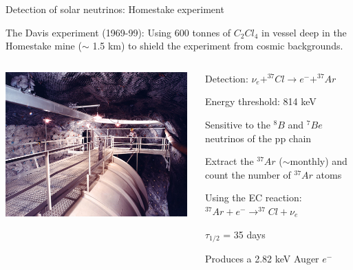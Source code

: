 \begin{frame}[t]{Detection of solar neutrinos: Homestake experiment}

The Davis experiment (1969-99): Using 600 tonnes of $C_{2}Cl_{4}$ in vessel deep in the Homestake mine
($\sim$ 1.5 km) to shield the experiment from cosmic backgrounds.\\
\vspace{0.3cm}
\begin{columns}
  \begin{column}{0.45\textwidth}
    \includegraphics[width=0.98\textwidth]{./images/3nu/solar/davis_experiment_photo.png}\\
  \end{column}
  \begin{column}{0.55\textwidth}
    \begin{itemize}
    {\small
     \item Detection: {\color{red}$\nu_{e} + ^{37}Cl \rightarrow e^{-}
         + ^{37}Ar$}\\
     \item Energy threshold: 814 keV
    \begin{itemize}
     {\small
        \item Sensitive to the $^{8}B$
          and $^{7}Be$ neutrinos of the pp chain
    }
    \end{itemize}
     \item Extract the $^{37}Ar$ ($\sim$monthly) and
       count the number of $^{37}Ar$ atoms
      \begin{itemize}
       {\small
         \item Using the EC reaction: {\color{red}$^{37}Ar +
           e^{-} \rightarrow ^{37}Cl + \nu_{e}$}
         \item $\tau_{1/2}$ = 35 days
         \item Produces a 2.82 keV Auger $e^{-}$
       }
       \end{itemize}
    }
    \end{itemize}
  \end{column}
\end{columns}
\end{frame}

